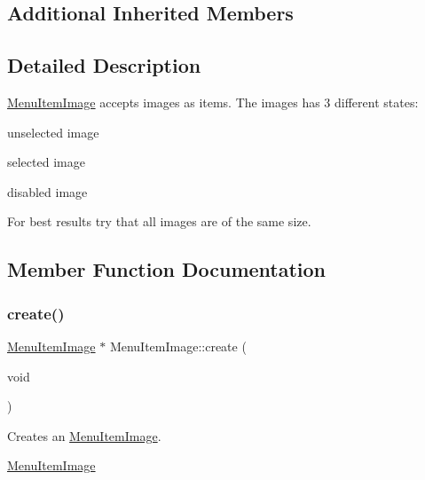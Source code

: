 \subsection*{Additional Inherited Members}


\subsection{Detailed Description}
\hyperlink{classMenuItemImage}{Menu\+Item\+Image} accepts images as items. The images has 3 different states\+: 


\begin{DoxyItemize}
\item unselected image
\item selected image
\item disabled image
\end{DoxyItemize}

For best results try that all images are of the same size. 

\subsection{Member Function Documentation}
\mbox{\label{classMenuItemImage_a37bdd75572fd67b62ec0220901f477e5}} 
\subsubsection{\texorpdfstring{create()}{create()}\hspace{0.1cm}{\footnotesize\ttfamily [1/14]}}
{\footnotesize\ttfamily \hyperlink{classMenuItemImage}{Menu\+Item\+Image} $\ast$ Menu\+Item\+Image\+::create (\begin{DoxyParamCaption}\item[{void}]{ }\end{DoxyParamCaption})\hspace{0.3cm}{\ttfamily [static]}}

Creates an \hyperlink{classMenuItemImage}{Menu\+Item\+Image}.

\hyperlink{classMenuItemImage}{Menu\+Item\+Image} \mbox{\label{classMenuItemImage_a27c985ee5c0982b105052a3ff49e5f61}} 
